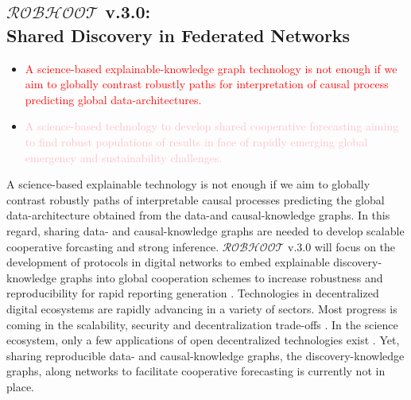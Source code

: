 \documentclass[11pt, a4paper]{article} %
\begin{document}
  
\subsection{{\bf $\mathcal{ROBHOOT}$ v.3.0}: \\ Shared Discovery in
  Federated Networks}

  \begin{itemize}
  \item \textcolor{red}{A science-based explainable-knowledge graph
      technology is not enough if we aim to globally contrast robustly
      paths for interpretation of causal process predicting global
      data-architectures.}
  \item \textcolor{pink}{A science-based technology to develop shared
      cooperative forecasting aiming to find robust populations of
      results in face of rapidly emerging global emergency and
      sustainability challenges.}
  \end{itemize}

  A science-based explainable technology is not enough if we aim to
  globally contrast robustly paths of interpretable causal processes
  predicting the global data-architecture obtained from the data-and
  causal-knowledge graphs. In this regard, sharing data- and
  causal-knowledge graphs are needed to develop scalable cooperative
  forcasting and strong inference. $\mathcal{ROBHOOT}$ v.3.0 will
  focus on the development of protocols in digital networks to embed
  explainable discovery-knowledge graphs into global cooperation
  schemes to increase robustness and reproducibility for rapid
  reporting generation \citep{Dilley2016}. Technologies in
  decentralized digital ecosystems are rapidly advancing in a variety
  of sectors. Most progress is coming in the scalability, security and
  decentralization trade-offs
  \citep{Golem2016,Dilley2016,Durov2017,Androulaki2018,OceanProtocolFoundation2018,BigchainDBGmbH2018}. In
  the science ecosystem, only a few applications of open decentralized
  technologies exist \citep{Gunther2018}. Yet, sharing reproducible
  data- and causal-knowledge graphs, the discovery-knowledge graphs,
  along networks to facilitate cooperative forecasting is currently
  not in place.
\end{document}
